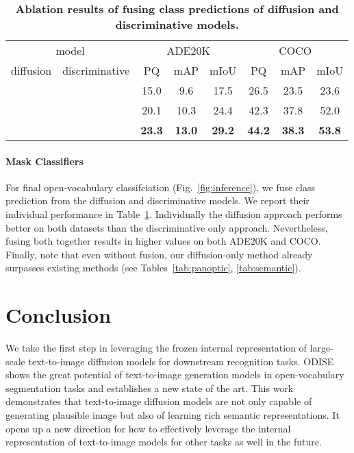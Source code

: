 \documentclass[10pt,twocolumn,letterpaper]{article}
\newcommand{\cmark}{\ding{51}}
\newcommand{\tablestyle}[2]{\setlength{\tabcolsep}{#1}\renewcommand{\arraystretch}{#2}\centering\small}
\newcommand{\ourmethod}{ODISE}
\begin{document}
\begin{table}[]
\tablestyle{2.5pt}{1.1}
\begin{tabular}{cc|ccc|ccc}
\multicolumn{2}{c|}{model}  & \multicolumn{3}{c|}{ADE20K}                    & \multicolumn{3}{c}{COCO}                      \\
diffusion & discriminative & PQ            & mAP           & mIoU          & PQ            & mAP           & mIoU          \\
\shline
          & \cmark         & 15.0          & 9.6           & 17.5          & 26.5          & 23.5          & 23.6          \\
\cmark    &                & 20.1          & 10.3          & 24.4          & 42.3          & 37.8          & 52.0          \\
\cmark    & \cmark         & \textbf{23.3} & \textbf{13.0} & \textbf{29.2} & \textbf{44.2} & \textbf{38.3} & \textbf{53.8}
\end{tabular}
\vspace{-.5em}
\caption{
    \label{tab:fusion}
    \textbf{Ablation results of fusing class predictions of diffusion and discriminative models.}
}
\vspace{-1.5em}
\end{table}

\paragraph{Mask Classifiers}
For final open-vocabulary classifciation (Fig.~\ref{fig:inference}), we fuse class prediction from the diffusion and discriminative models.
We report their individual performance in Table~\ref{tab:fusion}. 
Individually the diffusion approach performs better on both datasets than the discriminative only approach. Nevertheless, fusing both together results in higher values on both ADE20K and COCO. Finally, note that even without fusion, our diffusion-only method already surpasses existing methods (see Tables~\ref{tab:panoptic}, \ref{tab:semantic}).

\section{Conclusion}

We take the first step in leveraging the frozen internal representation of large-scale text-to-image diffusion models for downstream recognition tasks.
\ourmethod{} shows the great potential of text-to-image generation models in open-vocabulary segmentation tasks and establishes a new state of the art.
This work demonstrates that text-to-image diffusion models are not only capable of generating plausible image but also of learning rich semantic representations.
It opens up a new direction for how to effectively leverage the internal representation of text-to-image models for other tasks as well in the future.
\end{document}
